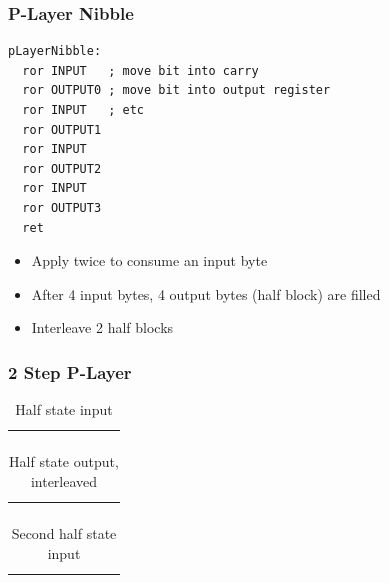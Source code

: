 \documentclass{beamer}
\begin{document}
\begin{frame}[fragile]
\frametitle{P-Layer Nibble}
\begin{lstlisting}
pLayerNibble:
  ror INPUT   ; move bit into carry
  ror OUTPUT0 ; move bit into output register
  ror INPUT   ; etc
  ror OUTPUT1
  ror INPUT
  ror OUTPUT2
  ror INPUT
  ror OUTPUT3
  ret
\end{lstlisting}
\begin{itemize}
\item Apply twice to consume an input byte
\item After 4 input bytes, 4 output bytes (half block) are filled
\item Interleave 2 half blocks
\end{itemize}
\end{frame}

\begin{frame}[fragile]
\frametitle{2 Step P-Layer}
  \begin{table}
  \begin{tabular}{  C  C  C  C  C  C  C  C  }
    \hline                        
     &  &  &  &
        &  &  &  \\ 
    \hline  
  \end{tabular}
  \caption*{Half state input}
  \end{table}

  \begin{table}
  \begin{tabular}{  C  C  C  C  C  C  C  C }
    \hline                        
        &  &  &  &  &  &  &  \\
    \hline  
  \end{tabular}
  \caption*{Half state output, interleaved}
  \end{table}

  \begin{table}
  \begin{tabular}{  C  C  C  C  C  C  C  C }
    \hline                        
        &  &  &  &  &  &  &  \\
    \hline  
  \end{tabular}
  \caption*{Second half state input}
  \end{table}


\end{frame}
\end{document}
